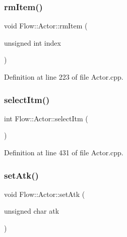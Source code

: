 \hypertarget{class_flow_1_1_actor_ad0c8afd90595778d5d7db6d1c011cf66}{}\label{class_flow_1_1_actor_ad0c8afd90595778d5d7db6d1c011cf66} 
\subsubsection{\texorpdfstring{rm\+Item()}{rmItem()}}
{\footnotesize\ttfamily void Flow\+::\+Actor\+::rm\+Item (\begin{DoxyParamCaption}\item[{unsigned int}]{index }\end{DoxyParamCaption})}



Definition at line 223 of file Actor.\+cpp.

\hypertarget{class_flow_1_1_actor_aa2e9fe8206357384b2b515fb4adc5613}{}\label{class_flow_1_1_actor_aa2e9fe8206357384b2b515fb4adc5613} 
\subsubsection{\texorpdfstring{select\+Itm()}{selectItm()}}
{\footnotesize\ttfamily int Flow\+::\+Actor\+::select\+Itm (\begin{DoxyParamCaption}{ }\end{DoxyParamCaption})}



Definition at line 431 of file Actor.\+cpp.

\hypertarget{class_flow_1_1_actor_acbf21154d7e206e1c9c40d43d6ae88b3}{}\label{class_flow_1_1_actor_acbf21154d7e206e1c9c40d43d6ae88b3} 
\subsubsection{\texorpdfstring{set\+Atk()}{setAtk()}\hspace{0.1cm}{\footnotesize\ttfamily [1/2]}}
{\footnotesize\ttfamily void Flow\+::\+Actor\+::set\+Atk (\begin{DoxyParamCaption}\item[{unsigned char}]{atk }\end{DoxyParamCaption})}



